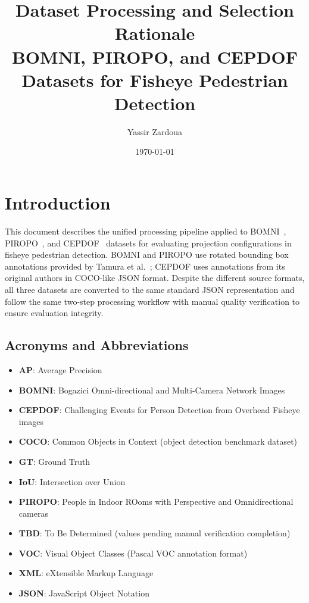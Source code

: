 \documentclass[11pt]{article}
\title{Dataset Processing and Selection Rationale\\
\large BOMNI, PIROPO, and CEPDOF Datasets for Fisheye Pedestrian Detection}
\author{Yassir Zardoua}
\date{\today}
\begin{document}
\maketitle

\section{Introduction}

This document describes the unified processing pipeline applied to BOMNI~\cite{bomni2014}, PIROPO~\cite{piropo2014}, and CEPDOF~\cite{cepdof2020} datasets for evaluating projection configurations in fisheye pedestrian detection. BOMNI and PIROPO use rotated bounding box annotations provided by Tamura et al.~\cite{tamura2019omnidirectional}; CEPDOF uses annotations from its original authors in COCO-like JSON format. Despite the different source formats, all three datasets are converted to the same standard JSON representation and follow the same two-step processing workflow with manual quality verification to ensure evaluation integrity.

\subsection{Acronyms and Abbreviations}

\begin{itemize}[leftmargin=*]
    \item \textbf{AP}: Average Precision
    \item \textbf{BOMNI}: Bogazici Omni-directional and Multi-Camera Network Images
    \item \textbf{CEPDOF}: Challenging Events for Person Detection from Overhead Fisheye images
    \item \textbf{COCO}: Common Objects in Context (object detection benchmark dataset)
    \item \textbf{GT}: Ground Truth
    \item \textbf{IoU}: Intersection over Union
    \item \textbf{PIROPO}: People in Indoor ROoms with Perspective and Omnidirectional cameras
    \item \textbf{TBD}: To Be Determined (values pending manual verification completion)
    \item \textbf{VOC}: Visual Object Classes (Pascal VOC annotation format)
    \item \textbf{XML}: eXtensible Markup Language
    \item \textbf{JSON}: JavaScript Object Notation
\end{itemize}
\end{document}
